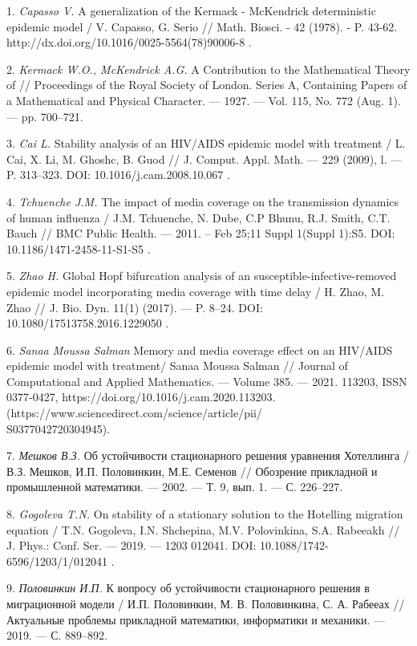 \litlist

1. {\it  Capasso V.} A generalization of the Kermack - McKendrick
deterministic epidemic model / V. Capasso, G. Serio // Math.
Biosci. - 42 (1978). - P. 43-62.
http://dx.doi.org/10.1016/0025-5564(78)90006-8 .

2. {\it  Kermack W.O.,  McKendrick A.G.} A Contribution to the
Mathematical Theory of  // Proceedings of the Royal Society of
London. Series A, Containing Papers of a Mathematical and Physical
Character. --- 1927. --- Vol. 115, No. 772 (Aug. 1). --- pp.
700--721.

3. {\it   Cai L.} Stability analysis of an HIV/AIDS epidemic model
with treatment / L. Cai, X. Li, M. Ghoshc, B. Guod // J. Comput.
Appl. Math. --- 229 (2009), l. --- P. 313--323. DOI:
10.1016/j.cam.2008.10.067 .

4.  {\it Tchuenche J.M.} The impact of media coverage on the
transmission dynamics of human influenza / J.M. Tchuenche, N.
Dube, C.P Bhunu, R.J. Smith, C.T. Bauch // BMC Public Health. ---
2011. -- Feb 25;11 Suppl 1(Suppl 1):S5. DOI:
10.1186/1471-2458-11-S1-S5 .

5. {\it Zhao H.} Global Hopf bifurcation analysis of an
susceptible-infective-removed epidemic model incorporating media
coverage with time delay / H. Zhao, M. Zhao // J. Bio. Dyn. 11(1)
(2017). --- P. 8--24. DOI: 10.1080/17513758.2016.1229050 .

6. {\it Sanaa Moussa Salman} Memory and media coverage effect on
an HIV/AIDS epidemic model with treatment/ Sanaa Moussa Salman //
Journal of Computational and Applied Mathematics. --- Volume 385.
--- 2021. 113203, ISSN 0377-0427,
https://doi.org/10.1016/j.cam.2020.113203.
(https://www.sciencedirect.com/science/article/pii/\\S0377042720304945).

7. {\it  Мешков В.З.} Об устойчивости стационарного решения
уравнения Хотеллинга / В.З.  Мешков, И.П. Половинкин, М.Е. Семенов
// Обозрение прикладной и промышленной математики. --- 2002. --- Т. 9,
вып. 1. --- С. 226--227.

8. {\it  Gogoleva T.N.} On stability of a stationary solution to
the Hotelling migration equation / T.N. Gogoleva, I.N. Shchepina,
M.V. Polovinkina, S.A. Rabeeakh // J. Phys.: Conf. Ser. --- 2019.
--- 1203 012041. DOI: 10.1088/1742-6596/1203/1/012041 .

9. {\it Половинкин И.П.} К вопросу об устойчивости стационарного
решения в миграционной модели / И.П. Половинкин, М. В.
Половинкина, С. А. Рабееах // Актуальные проблемы прикладной
математики, информатики и механики. --- 2019. --- С. 889--892.

